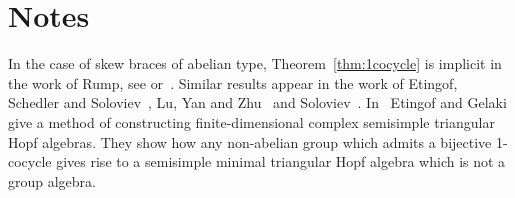 
\section{Notes}

In the case of skew braces of abelian type, Theorem~\ref{thm:1cocycle} is implicit in the work of Rump, see \cite{MR2278047,MR3291816} or~\cite{MR3177933}. Similar results appear 
in the work of Etingof, Schedler and Soloviev~\cite{MR1722951}, Lu, Yan and Zhu~\cite{MR1769723} 
and Soloviev~\cite{MR1809284}.
In~\cite{MR1653340} Etingof and Gelaki give a method of constructing finite-dimensional complex semisimple triangular Hopf algebras. They show how any non-abelian group which admits a bijective 1-cocycle gives rise to a semisimple minimal triangular Hopf algebra which is not a group algebra.
